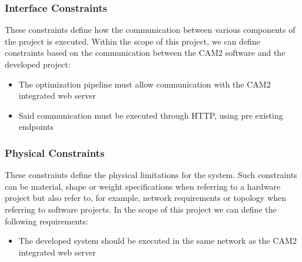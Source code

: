 
\subsubsection{Interface Constraints} 

These constraints define how the communication between various components of the project is executed. Within the scope of this project, we can define constraints based on the communication between the CAM2\textsuperscript{\textregistered} software and the developed project:

\begin{itemize}
	\item The optimization pipeline must allow communication with the CAM2\textsuperscript{\textregistered} integrated web server
	\item Said communication must be executed through HTTP, using pre existing endpoints
\end{itemize}

\subsubsection{Physical Constraints}

These constraints define the physical limitations for the system. Such constraints can be material, shape or weight specifications when referring to a hardware project but also refer to, for example, network requirements or topology when referring to software projects. In the scope of this project we can define the following requirements:

\begin{itemize}
	\item The developed system should be executed in the same network as the CAM2\textsuperscript{\textregistered} integrated web server
\end{itemize}
